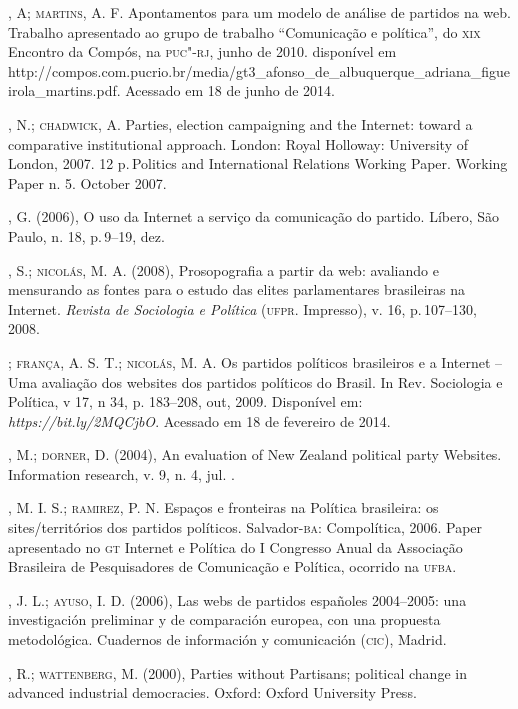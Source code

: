 \begin{bibliohedra}
, A; \textsc{martins}, A. F. Apontamentos para um modelo de análise
de partidos na web. Trabalho apresentado ao grupo de trabalho
``Comunicação e política'', do \textsc{xix} Encontro da Compós, na \textsc{puc"-rj}, junho
de 2010. disponível em
http://compos.com.pucrio.br/media/gt3\_afonso\_de\_albuquerque\_adriana\_figueirola\_martins.pdf.
Acessado em 18 de junho de 2014.

, N.; \textsc{chadwick}, A. Parties, election campaigning and the
Internet: toward a comparative institutional approach. London: Royal
Holloway: University of London, 2007. 12 p.\,Politics and International
Relations Working Paper. Working Paper n. 5. October 2007.

, G. (2006), O uso da Internet a serviço da comunicação do
partido. Líbero, São Paulo, n. 18, p.\,9--19, dez.

, S.; \textsc{nicolás}, M. A. (2008), Prosopografia a partir da web:
avaliando e mensurando as fontes para o estudo das elites parlamentares
brasileiras na Internet. \emph{Revista de Sociologia e Política} (\textsc{ufpr}.
Impresso), v. 16, p.\,107--130, 2008.

\titidem; \textsc{frança}, A. S. T.; \textsc{nicolás}, M. A. Os partidos políticos
brasileiros e a Internet -- Uma avaliação dos websites dos partidos
políticos do Brasil. In Rev. Sociologia e Política, v 17, n 34, p.
183--208, out, 2009. Disponível em:
\emph{https://bit.ly/2MQCjbO}. Acessado em 18 de
fevereiro de 2014.

, M.; \textsc{dorner}, D. (2004), An evaluation of New Zealand political
party Websites. Information research, v. 9, n. 4, jul. .

, M. I. S.; \textsc{ramirez}, P. N. Espaços e fronteiras na Política
brasileira: os sites/territórios dos partidos políticos. Salvador-\textsc{ba}:
Compolítica, 2006. Paper apresentado no \textsc{gt} Internet e Política do I
Congresso Anual da Associação Brasileira de Pesquisadores de Comunicação
e Política, ocorrido na \textsc{ufba}.

, J. L.; \textsc{ayuso}, I. D. (2006), Las webs de partidos españoles
2004--2005: una investigación preliminar y de comparación europea, con
una propuesta metodológica. Cuadernos de información y comunicación
(\textsc{cic}), Madrid.

, R.; \textsc{wattenberg}, M. (2000), Parties without Partisans; political
change in advanced industrial democracies. Oxford: Oxford University
Press.


\end{bibliohedra}

